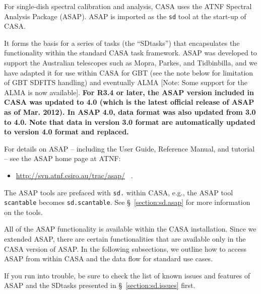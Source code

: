For single-dish spectral calibration and analysis, 
CASA uses the ATNF Spectral Analysis Package (ASAP).
ASAP is imported as the {\tt sd} tool at the start-up of CASA.

It forms the basis for a series
of tasks (the ``SDtasks'') that encapsulates the functionality
within the standard CASA task framework.  ASAP was developed to
support the Australian telescopes such as Mopra, Parkes, and
Tidbinbilla, and we have adapted it for use within CASA for
GBT (see the note below for limitation of GBT SDFITS handling) 
and eventually ALMA [Note: Some support for the ALMA is now available].  
{\bf For R3.4 or later, the ASAP version included in CASA was updated to 4.0
(which is the latest official release of ASAP as of Mar. 2012).
In ASAP 4.0, data format was also updated from 3.0 to 4.0. 
Note that data in version 3.0 format are automatically updated to version 4.0 format and replaced.}

For details on ASAP -- including the User Guide, Reference Manual, and tutorial -- see
the ASAP home page at ATNF: 
\begin{itemize}
   \item \url{http://svn.atnf.csiro.au/trac/asap/} \, .
\end{itemize}
The ASAP tools are prefaced with {\tt sd.} within CASA, e.g., the ASAP tool {\tt scantable} becomes
{\tt sd.scantable}.  See \S~\ref{section:sd.asap} for more
information on the tools.

All of the ASAP functionality is available within the CASA
installation.  Since we extended ASAP, there
are certain functionalities that are available only in the CASA version of ASAP.
In the following subsections, we outline how to access ASAP
from within CASA and the data flow for standard use cases.

If you run into trouble, be sure to check the list of known issues
and features of ASAP and the SDtasks presented in 
\S~\ref{section:sd.issues} first.


